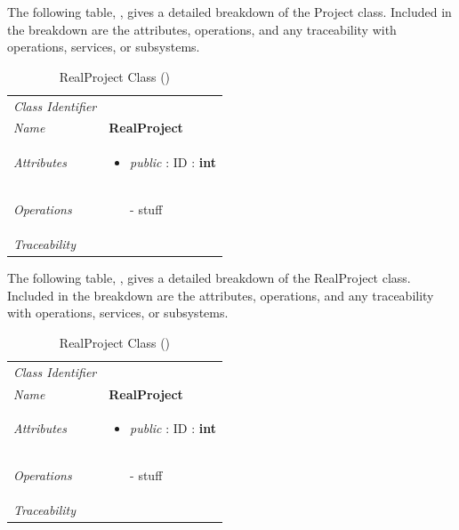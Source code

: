 \documentclass[12pt,letterpaper]{article}
\begin{document}
The following table, , gives a detailed breakdown of the Project class. Included in the breakdown are the attributes, operations, and any traceability with operations, services, or subsystems.

\begin{table}[H]
    \caption{RealProject Class ()} 
	\begin{tabu} to 
		\toprule
		Class Identifier &  \\
		Name & {\bf RealProject} \\
		Attributes & 
		\begin{minipage}[t]{\linewidth}
		    \begin{itemize}
		        \item \textit{public} : ID : \bf{int}
			\end{itemize}
	    \end{minipage} \\

		Operations &
		\begin{minipage}[t]{\linewidth}
			\begin{enumerate}
			    \item[-] stuff
	        \end{enumerate}
	    \end{minipage} \\
	    	Traceability & \\
		\toprule
	\end{tabu}
\end{table}

The following table, , gives a detailed breakdown of the RealProject class. Included in the breakdown are the attributes, operations, and any traceability with operations, services, or subsystems.

\begin{table}[H]
    \caption{RealProject Class ()} 
	\begin{tabu} to 
		\toprule
		Class Identifier &  \\
		Name & {\bf RealProject} \\
		Attributes & 
		\begin{minipage}[t]{\linewidth}
		    \begin{itemize}
		        \item \textit{public} : ID : \bf{int}
			\end{itemize}
	    \end{minipage} \\

		Operations &
		\begin{minipage}[t]{\linewidth}
			\begin{enumerate}
			    \item[-] stuff
	        \end{enumerate}
	    \end{minipage} \\
	    	Traceability & \\
		\toprule
	\end{tabu}
\end{table}
\end{document}
